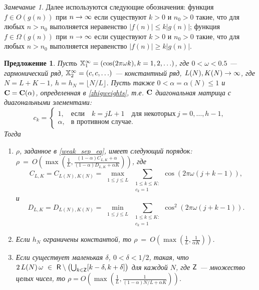 \documentclass[12pt, specialist, subf,href,colorlinks=true,substylefile = spbu.rtx]{disser}
\newtheorem{proposition}{Предложение}
\theoremstyle{remark}
\newtheorem{remark}{Замечание}
\theoremstyle{definition}
\begin{document}
\begin{remark}
	Далее используются следующие обозначения:
	функция $f \in O(g(n))$ при $n\rightarrow \infty$ если существуют $k>0$ и $n_0>0$ такие, что для любых $n > n_0$ выполняется неравенство $|f(n)| \le k |g(n)|$;
	функция $f \in \Omega(g(n))$ при $n\rightarrow \infty$ если существуют $k>0$ и $n_0>0$ такие, что для любых $n > n_0$ выполняется неравенство $|f(n)| \ge k |g(n)|$.
\end{remark}


\begin{proposition}
	\label{prop:separ1}
	Пусть $\mathbb{X}_1^\infty = (\cos(2 \pi \omega k), k = 1, 2, \ldots)$, где $0<\omega <0.5$ --- гармонический ряд, $\mathbb{X}_2^\infty = (c, c, \ldots)$ --- константный ряд,  $L(N),K(N)\rightarrow \infty$, где $N=L+K-1$, $h = h_N = \lfloor N/L \rfloor$. Пусть также $0<\alpha=\alpha(N)\le 1$ и $\mathbf{C}=\mathbf{C}(\alpha)$, определенная в \eqref{zhigweights}, т.е. $\mathbf{C}$ диагональная матрица с диагональными элементами:
	\begin{equation*}
	c_k = \begin{cases}
	1, & \text{если} \quad k = jL+1 \quad \text{для некоторых} \ j = 0, \ldots, h-1,\\
	\alpha, & \text{в противном случае}.
	\end{cases}
	\end{equation*}
	Тогда
	\begin{enumerate}
		\item $\rho$, заданное в \eqref{weak_sep_eq}, имеет следующий порядок: $\rho~=~O\left(\max\left(\frac{1}{L}, \frac{(1-\alpha)C_{L,K}+\alpha}{(1-\alpha)D_{L,K}+\alpha K}\right)\right)$, где
		\begin{equation*}
		C_{L,K} = C_{L(N),K(N)} = \max_{\substack{1 \le j \le L}}  \sum_{\substack{1 \le k \le K: \\ c_k = 1}}\cos(2 \pi \omega (j + k - 1)),		\end{equation*} и
		\begin{equation*}
		D_{L,K} = D_{L(N),K(N)} = \min_{\substack{1 \le j \le L}} \sum_{\substack{1 \le k \le K: \\ c_k = 1}}\cos^2(2 \pi \omega (j + k - 1)).
		\end{equation*}
		\item Если $h_N$ ограничены константой, то $\rho~=~O\left(\max\left(\frac{1}{L}, \frac{1}{\alpha K}\right)\right)$.
		\item Если существует маленькая $\delta$, $0 < \delta < 1/2$, такая, что $2\,L(N)\,\omega~\in~ \mathsf{R} \setminus \left(\bigcup_{k \in \mathsf{Z}} [k - \delta, k + \delta] \right)$ для каждой $N$, где $\mathsf{Z}$ --- множество целых чисел, то $\rho = O\left(\max\left(\frac{1}{L}, \frac{1}{(1-\alpha)N/L+\alpha K}\right)\right)$.
	\end{enumerate}
	
\end{proposition}
\end{document}

